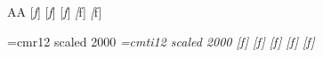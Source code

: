 \selffamily AA
       [{\it f}]   [{\it f\/}]   [\/{\it f\/}]   {\it [}f]   {\it [\/}f\/]\par
\bgroup
    \font\rm=cmr12 scaled 2000
    \font\it=cmti12 scaled 2000
    \rm[{\it f}]   [{\it f\/}]   [\/{\it f\/}]   {\it [}f]   {\it [\/}f\/]\par
\egroup\par
[\R0{\it f\/}] [\R1{\it f\/}] [\R2{\it f\/}] [\R3{\it f\/}] [\R4{\it f\/}]
[\R5{\it f\/}] [\R6{\it f\/}] [\R7{\it f\/}] [\R8{\it f\/}] [\R9{\it f\/}]
\bye
